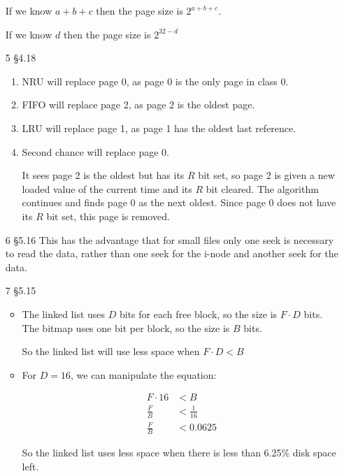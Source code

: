 \documentclass[12pt,letterpaper]{article}
\begin{document}
\begin{enumerate}
      If we know $a + b + c$ then the page size is $2^{a + b + c}$.

      If we know $d$ then the page size is $2^{32 - d}$
    \item [5 \S 4.18]
      \begin{enumerate}
        \item NRU will replace page 0, as page 0 is the only page in class 0.
        \item FIFO will replace page 2, as page 2 is the oldest page.
        \item LRU will replace page 1, as page 1 has the oldest last reference.
        \item Second chance will replace page 0.

          It sees page 2 is the oldest but has its $R$ bit set,
          so page 2 is given a new loaded value of the current time
          and its $R$ bit cleared.
          The algorithm continues and finds page 0 as the next oldest.
          Since page 0 does not have its $R$ bit set, this page is removed.
      \end{enumerate}
    \item [6 \S 5.16]
      This has the advantage that for small files only one seek is necessary to read the data,
      rather than one seek for the i-node and another seek for the data.
    \item [7 \S 5.15]
      \begin{itemize}
        \item
          The linked list uses $D$ bits for each free block, so the size is $F \cdot D$ bits.
          The bitmap uses one bit per block, so the size is $B$ bits.

          So the linked list will use less space when $F \cdot D < B$
        \item
          For $D = 16$, we can manipulate the equation:

          \begin{align*}
            F \cdot 16 &< B \\
            \frac{F}{B} &< \frac{1}{16} \\
            \frac{F}{B} &< 0.0625
          \end{align*}

          So the linked list uses less space when there is less than 6.25\% disk space left.
      \end{itemize}
  \end{enumerate}
\end{document}
